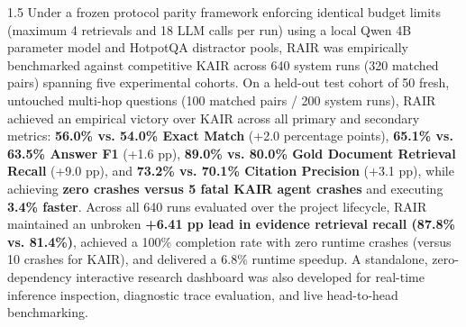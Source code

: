 \documentclass[12pt,a4paper]{report}
\begin{document}
\begin{spacing}{1.5}
Under a frozen protocol parity framework enforcing identical budget limits (maximum 4 retrievals and 18 LLM calls per run) using a local Qwen 4B parameter model and HotpotQA distractor pools, RAIR was empirically benchmarked against competitive KAIR across 640 system runs (320 matched pairs) spanning five experimental cohorts. On a held-out test cohort of 50 fresh, untouched multi-hop questions (100 matched pairs / 200 system runs), RAIR achieved an empirical victory over KAIR across all primary and secondary metrics: \textbf{56.0\% vs. 54.0\% Exact Match} (+2.0 percentage points), \textbf{65.1\% vs. 63.5\% Answer F1} (+1.6 pp), \textbf{89.0\% vs. 80.0\% Gold Document Retrieval Recall} (+9.0 pp), and \textbf{73.2\% vs. 70.1\% Citation Precision} (+3.1 pp), while achieving \textbf{zero crashes versus 5 fatal KAIR agent crashes} and executing \textbf{3.4\% faster}. Across all 640 runs evaluated over the project lifecycle, RAIR maintained an unbroken \textbf{+6.41 pp lead in evidence retrieval recall (87.8\% vs. 81.4\%)}, achieved a 100\% completion rate with zero runtime crashes (versus 10 crashes for KAIR), and delivered a 6.8\% runtime speedup. A standalone, zero-dependency interactive research dashboard was also developed for real-time inference inspection, diagnostic trace evaluation, and live head-to-head benchmarking.
\end{spacing}
\clearpage

\clearpage
\begingroup
\onehalfspacing
\tableofcontents
\endgroup
\clearpage

\listoftables
{}
\clearpage

\listoffigures
{}
\clearpage

\setcounter{page}{1}
\end{document}
